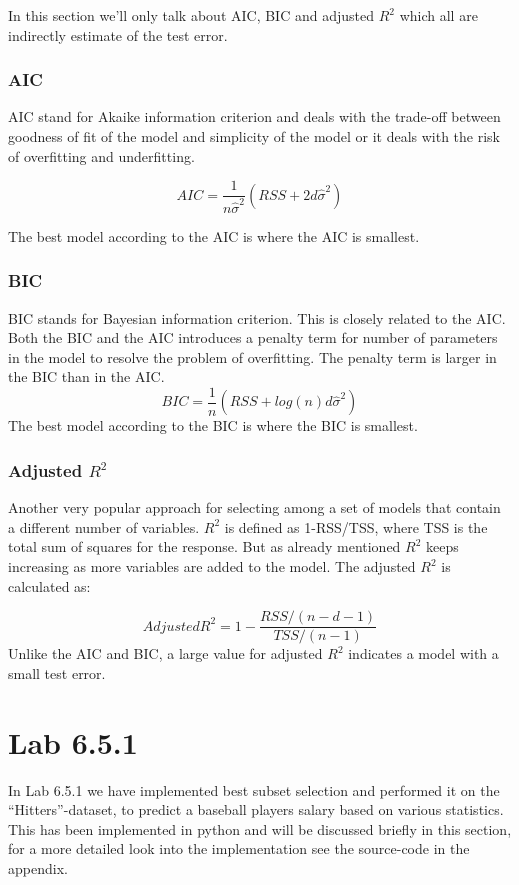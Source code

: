 In this section we’ll only talk about AIC, BIC and adjusted $R^2$ which all are indirectly estimate of the test error.

\subsubsection{AIC}
AIC stand for Akaike information criterion and deals with the trade-off between goodness of fit of the model and simplicity of the model or it deals with the risk of overfitting and underfitting.

\begin{equation}
AIC=\frac{1}{n\hat{\sigma}^2}(RSS+2d\hat{\sigma}^2)\label{AIC_eq}
\end{equation}

The best model according to the AIC is where the AIC is smallest.

\subsubsection{BIC}
BIC stands for Bayesian information criterion. This is closely related to the AIC. Both the BIC and the AIC introduces a penalty term for number of parameters in the model to resolve the problem of overfitting. The penalty term is larger in the BIC than in the AIC. 
\begin{equation}
BIC=\frac{1}{n}(RSS+log(n)d\hat{\sigma}^2)\label{BIC_eq}
\end{equation}
The best model according to the BIC is where the BIC is smallest. 



\subsubsection{Adjusted $R^2$}
Another very popular approach for selecting among a set of models that contain a different number of variables. $R^2$ is defined as 1-RSS/TSS, where TSS is the total sum of squares for the response. But as already mentioned $R^2$ keeps increasing as more variables are added to the model. The adjusted $R^2$ is calculated as:

\begin{equation}
Adjusted R^2=1-\frac{RSS/(n-d-1)}{TSS/(n-1)}\label{Adjusted_R2_eq}
\end{equation}
Unlike the AIC and BIC, a large value for adjusted $R^2$ indicates a model with a small test error. 


\section{Lab 6.5.1}
In Lab 6.5.1 we have implemented best subset selection and performed it on the “Hitters”-dataset, to predict a baseball players salary based on various statistics. This has been implemented in python and will be discussed briefly in this section, for a more detailed look into the implementation see the source-code in the appendix. 


